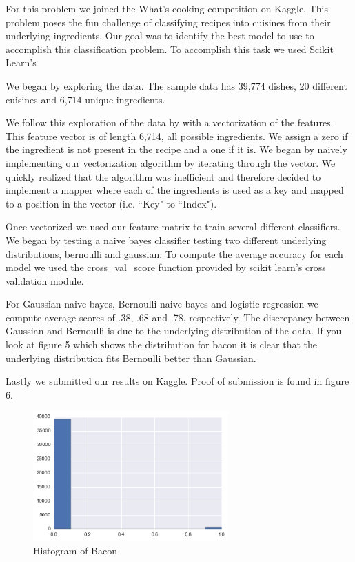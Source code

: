 \documentclass[12pt]{report}
\begin{document}
For this problem we joined the What's cooking competition on Kaggle. This problem poses the fun challenge of classifying recipes into cuisines from their underlying ingredients. Our goal was to identify the best model to use to accomplish this classification problem. To accomplish this task we used Scikit Learn's 

We began by exploring the data. The sample data has 39,774 dishes, 20 different cuisines and 6,714 unique ingredients. 

We follow this exploration of the data by with a vectorization of the features. This feature vector is of length 6,714, all possible ingredients. We assign a zero if the ingredient is not present in the recipe and a one if it is. We began by naively implementing our vectorization algorithm by iterating through the vector. We quickly realized that the algorithm was inefficient and therefore decided to implement a mapper where each of the ingredients is used as a key and mapped to a position in the vector (i.e. ``Key" to ``Index"). 

Once vectorized we used our feature matrix to train several different classifiers. We began by testing a naive bayes classifier testing two different underlying distributions, bernoulli and gaussian. To compute the average accuracy for each model we used the cross\_val\_score function provided by scikit learn's cross validation module.

For Gaussian naive bayes, Bernoulli naive bayes and logistic regression we compute average scores of .38, .68 and .78, respectively. The discrepancy between Gaussian and Bernoulli is due to the underlying distribution of the data. If you look at figure 5 which shows the distribution for bacon it is clear that the underlying distribution fits Bernoulli better than Gaussian.

Lastly we submitted our results on Kaggle. Proof of submission is found in figure 6.

\begin{figure}
\centering
  \includegraphics[width=75mm]{figures/bernouli.png}
\caption{Histogram of Bacon}
\end{figure}
\end{document}
